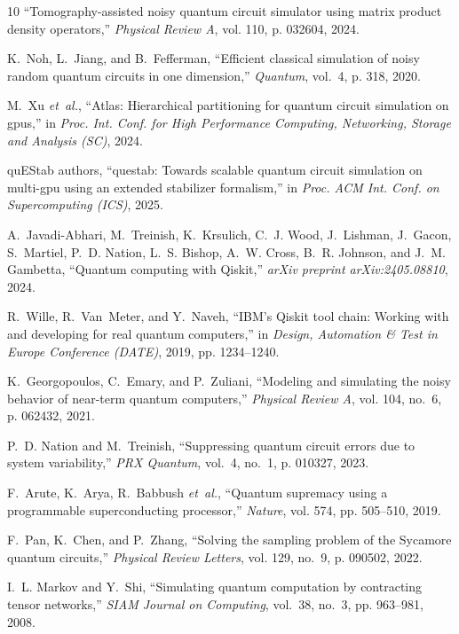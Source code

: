 \documentclass{ieeeaccess}
\begin{document}
\begin{thebibliography}{10}
``Tomography-assisted noisy quantum circuit simulator using matrix product
  density operators,'' \emph{Physical Review A}, vol. 110, p. 032604, 2024.

K.~Noh, L.~Jiang, and B.~Fefferman, ``Efficient classical simulation of noisy
  random quantum circuits in one dimension,'' \emph{Quantum}, vol.~4, p. 318,
  2020.

M.~Xu \emph{et~al.}, ``Atlas: Hierarchical partitioning for quantum circuit
  simulation on gpus,'' in \emph{Proc. Int. Conf. for High Performance
  Computing, Networking, Storage and Analysis (SC)}, 2024.

{quEStab authors}, ``questab: Towards scalable quantum circuit simulation on
  multi-gpu using an extended stabilizer formalism,'' in \emph{Proc. ACM Int.
  Conf. on Supercomputing (ICS)}, 2025.

A.~Javadi-Abhari, M.~Treinish, K.~Krsulich, C.~J. Wood, J.~Lishman, J.~Gacon,
  S.~Martiel, P.~D. Nation, L.~S. Bishop, A.~W. Cross, B.~R. Johnson, and J.~M.
  Gambetta, ``Quantum computing with {Qiskit},'' \emph{arXiv preprint
  arXiv:2405.08810}, 2024.

R.~Wille, R.~Van~Meter, and Y.~Naveh, ``{IBM}'s {Qiskit} tool chain: Working
  with and developing for real quantum computers,'' in \emph{Design, Automation
  \& Test in Europe Conference (DATE)}, 2019, pp. 1234--1240.

K.~Georgopoulos, C.~Emary, and P.~Zuliani, ``Modeling and simulating the noisy
  behavior of near-term quantum computers,'' \emph{Physical Review A}, vol.
  104, no.~6, p. 062432, 2021.

P.~D. Nation and M.~Treinish, ``Suppressing quantum circuit errors due to
  system variability,'' \emph{PRX Quantum}, vol.~4, no.~1, p. 010327, 2023.

F.~Arute, K.~Arya, R.~Babbush \emph{et~al.}, ``Quantum supremacy using a
  programmable superconducting processor,'' \emph{Nature}, vol. 574, pp.
  505--510, 2019.

F.~Pan, K.~Chen, and P.~Zhang, ``Solving the sampling problem of the {Sycamore}
  quantum circuits,'' \emph{Physical Review Letters}, vol. 129, no.~9, p.
  090502, 2022.

I.~L. Markov and Y.~Shi, ``Simulating quantum computation by contracting tensor
  networks,'' \emph{SIAM Journal on Computing}, vol.~38, no.~3, pp. 963--981,
  2008.


\end{thebibliography}
\end{document}

